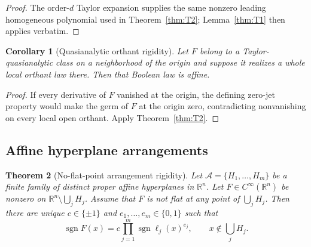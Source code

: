 \documentclass[11pt]{article}
\newtheorem{theorem}{Theorem}[section]
\newtheorem{corollary}[theorem]{Corollary}
\theoremstyle{definition}
\theoremstyle{remark}
\newcommand{\R}{\mathbb{R}}
\newcommand{\bits}{\{0,1\}}
\newcommand{\sign}{\operatorname{sgn}}
\newcommand{\cA}{\mathcal{A}}
\begin{document}
\begin{proof}
The order-$d$ Taylor expansion supplies the same nonzero leading homogeneous polynomial used in Theorem~\ref{thm:T2}; Lemma~\ref{thm:T1} then applies verbatim.
\end{proof}

\begin{corollary}[Quasianalytic orthant rigidity]\label{cor:quasiorth}
Let $F$ belong to a Taylor-quasianalytic class on a neighborhood of the origin and suppose it realizes a whole local orthant law there. Then that Boolean law is affine.
\end{corollary}

\begin{proof}
If every derivative of $F$ vanished at the origin, the defining zero-jet property would make the germ of $F$ at the origin zero, contradicting nonvanishing on every local open orthant. Apply Theorem~\ref{thm:T2}.
\end{proof}

\subsection{Affine hyperplane arrangements}

\begin{theorem}[No-flat-point arrangement rigidity]\label{thm:T3}
Let $\cA=\{H_1,\dots,H_m\}$ be a finite family of distinct proper affine hyperplanes in $\R^n$. Let $F\in C^\infty(\R^n)$ be nonzero on $\R^n\setminus\bigcup_jH_j$. Assume that $F$ is not flat at any point of $\bigcup_jH_j$. Then there are unique $c\in\{\pm1\}$ and $e_1,\dots,e_m\in\bits$ such that
\begin{equation}\label{eq:arrparity}
 \sign F(x)
 =c\prod_{j=1}^m\sign\ell_j(x)^{e_j},
 \qquad x\notin\bigcup_jH_j.
\end{equation}
\end{theorem}
\end{document}
